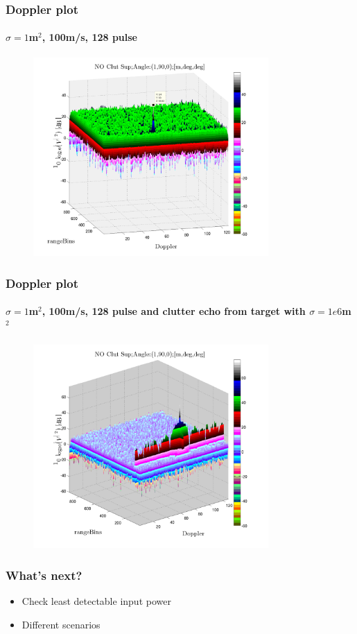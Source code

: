 \documentclass[11pt]{beamer} %
\begin{document}
\begin{frame}
 \frametitle{Doppler plot}
\framesubtitle{$\sigma=1$m$^2$, 100m/s, 128 pulse}
\begin{figure}
\includegraphics[width=0.8\textwidth]{Figures/DopplerSingleTarg1Km100ms128Puls.pdf}
\end{figure}
\end{frame}

\begin{frame}
\frametitle{Doppler plot}
\framesubtitle{$\sigma=1$m$^2$, 100m/s, 128 pulse and clutter echo from target with $\sigma=1e6$m$^2$}
   \begin{figure}
\includegraphics[width=0.8\textwidth]{Figures/Doppler1Km100ms128Puls.pdf}
\end{figure}
\end{frame}


\begin{frame}
 \frametitle{What's next?}
\begin{itemize}
\item Check least detectable input power 
\item Different scenarios


\end{itemize}

\end{frame}
\end{document}
